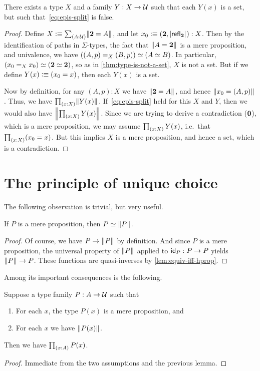 \begin{lem}\label{thm:no-higher-ac}
  There exists a type $X$ and a family $Y:X\to \type$ such that each $Y(x)$ is a set, but such that~\eqref{eq:epis-split} is false.
\end{lem}
\begin{proof}
  Define $X\defeq \sm{A:\type} \brck{\bool = A}$, and let $x_0 \defeq (\bool, \bproj{\refl{\bool}}) : X$.
  Then by the identification of paths in $\Sigma$-types, the fact that $\brck{A=\bool}$ is a mere proposition, and univalence, we have $\eqv{(\id[X]{(A,p)}{(B,p)})}{(\eqv AB)}$.
  In particular, $\eqv{(\id[X]{x_0}{x_0})}{(\eqv \bool\bool)}$, so as in \autoref{thm:type-is-not-a-set}, $X$ is not a set.
  But if we define $Y(x) \defeq (x_0=x)$, then each $Y(x)$ is a set.

  Now by definition, for any $(A,p):X$ we have $\brck{\bool=A}$, and hence $\brck{x_0 = (A,p)}$.
  Thus, we have $\prd{x:X} \brck{Y(x)}$.
  If~\eqref{eq:epis-split} held for this $X$ and $Y$, then we would also have $\brck{\prd{x:X} Y(x)}$.
  Since we are trying to derive a contradiction ($\emptyt$), which is a mere proposition, we may assume $\prd{x:X} Y(x)$, i.e.\ that $\prd{x:X} (x_0=x)$.
  But this implies $X$ is a mere proposition, and hence a set, which is a contradiction.
\end{proof}

\section{The principle of unique choice}
\label{sec:unique-choice}

The following observation is trivial, but very useful.

\begin{lem}
  If $P$ is a mere proposition, then $\eqv P {\brck P}$.
\end{lem}
\begin{proof}
  Of course, we have $P\to \brck{P}$ by definition.
  And since $P$ is a mere proposition, the universal property of $\brck P$ applied to $\idfunc[P] :P\to P$ yields $\brck P \to P$.
  These functions are quasi-inverses by \autoref{lem:equiv-iff-hprop}.
\end{proof}

Among its important consequences is the following.

\begin{cor}\label{cor:UC}
  Suppose a type family $P:A\to \type$ such that
  \begin{enumerate}
  \item For each $x$, the type $P(x)$ is a mere proposition, and
  \item For each $x$ we have $\brck {P(x)}$.
  \end{enumerate}
  Then we have $\prd{x:A} P(x)$.
\end{cor}
\begin{proof}
  Immediate from the two assumptions and the previous lemma.
\end{proof}

